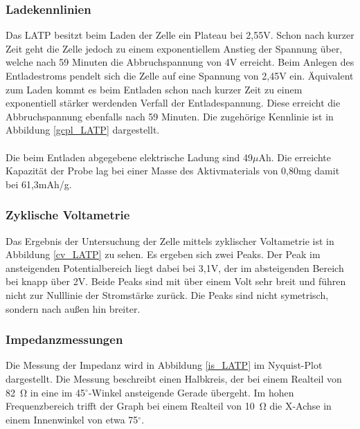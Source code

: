 \documentclass[a4paper, 11pt, headsepline,footsepline,twoside,abstract]{scrbook}
\begin{document}
\subsubsection{Ladekennlinien}
Das LATP besitzt beim Laden der Zelle ein Plateau bei 2,55V. Schon nach kurzer Zeit geht die Zelle jedoch zu einem exponentiellem Anstieg der Spannung über, welche nach 59 Minuten die Abbruchspannung von 4V erreicht. Beim Anlegen des Entladestroms pendelt sich die Zelle auf eine Spannung von 2,45V ein. Äquivalent zum Laden kommt es beim Entladen schon nach kurzer Zeit zu einem exponentiell stärker werdenden Verfall der Entladespannung. Diese erreicht die Abbruchspannung ebenfalls nach 59 Minuten. Die zugehörige Kennlinie ist in Abbildung \ref{gcpl_LATP} dargestellt. 
\\\\
Die beim Entladen abgegebene elektrische Ladung sind 49$\mu$Ah. Die erreichte Kapazität der Probe lag bei einer Masse des Aktivmaterials von 0,80mg damit bei 61,3mAh/g. 
\subsubsection{Zyklische Voltametrie}
Das Ergebnis der Untersuchung der Zelle mittels zyklischer Voltametrie ist in Abbildung \ref{cv_LATP} zu sehen. Es ergeben sich zwei Peaks. Der Peak im ansteigenden Potentialbereich liegt dabei bei 3,1V, der im absteigenden Bereich bei knapp über 2V. Beide Peaks sind mit über einem Volt sehr breit und führen nicht zur Nulllinie der Stromstärke zurück. Die Peaks sind nicht symetrisch, sondern nach außen hin breiter.
\subsubsection{Impedanzmessungen}
Die Messung der Impedanz wird in Abbildung \ref{is_LATP} im Nyquist-Plot dargestellt. Die Messung beschreibt einen Halbkreis, der bei einem Realteil von \SI{82}{\ohm} in eine im 45$^\circ$-Winkel ansteigende Gerade übergeht. Im hohen Frequenzbereich trifft der Graph bei einem Realteil von \SI{10}{\ohm} die X-Achse in einem Innenwinkel von etwa 75$^\circ$.
\newpage
\end{document}
